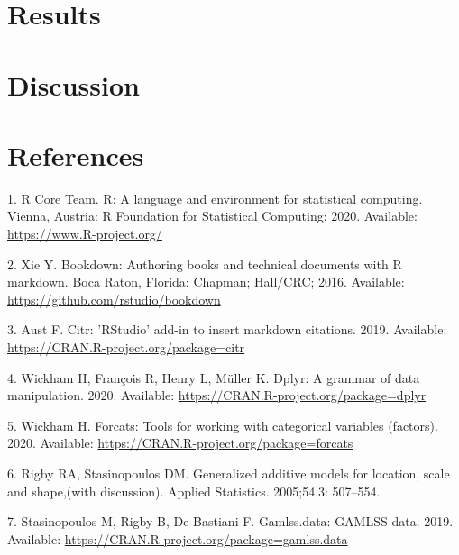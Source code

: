 \documentclass[10pt,letterpaper]{article}
\begin{document}
\hypertarget{results}{%
\section{Results}\label{results}}

\hypertarget{discussion}{%
\section{Discussion}\label{discussion}}

\newpage

\hypertarget{references}{%
\section{References}\label{references}}

\begingroup
\setlength{\parindent}{-0.5in}
\setlength{\leftskip}{0.5in}

\hypertarget{refs}{}
\leavevmode\hypertarget{ref-R-base}{}%
1. R Core Team. R: A language and environment for statistical computing. Vienna, Austria: R Foundation for Statistical Computing; 2020. Available: \url{https://www.R-project.org/}

\leavevmode\hypertarget{ref-R-bookdown}{}%
2. Xie Y. Bookdown: Authoring books and technical documents with R markdown. Boca Raton, Florida: Chapman; Hall/CRC; 2016. Available: \url{https://github.com/rstudio/bookdown}

\leavevmode\hypertarget{ref-R-citr}{}%
3. Aust F. Citr: 'RStudio' add-in to insert markdown citations. 2019. Available: \url{https://CRAN.R-project.org/package=citr}

\leavevmode\hypertarget{ref-R-dplyr}{}%
4. Wickham H, François R, Henry L, Müller K. Dplyr: A grammar of data manipulation. 2020. Available: \url{https://CRAN.R-project.org/package=dplyr}

\leavevmode\hypertarget{ref-R-forcats}{}%
5. Wickham H. Forcats: Tools for working with categorical variables (factors). 2020. Available: \url{https://CRAN.R-project.org/package=forcats}

\leavevmode\hypertarget{ref-R-gamlss}{}%
6. Rigby RA, Stasinopoulos DM. Generalized additive models for location, scale and shape,(with discussion). Applied Statistics. 2005;54.3: 507--554.

\leavevmode\hypertarget{ref-R-gamlss.data}{}%
7. Stasinopoulos M, Rigby B, De Bastiani F. Gamlss.data: GAMLSS data. 2019. Available: \url{https://CRAN.R-project.org/package=gamlss.data}
\end{document}
